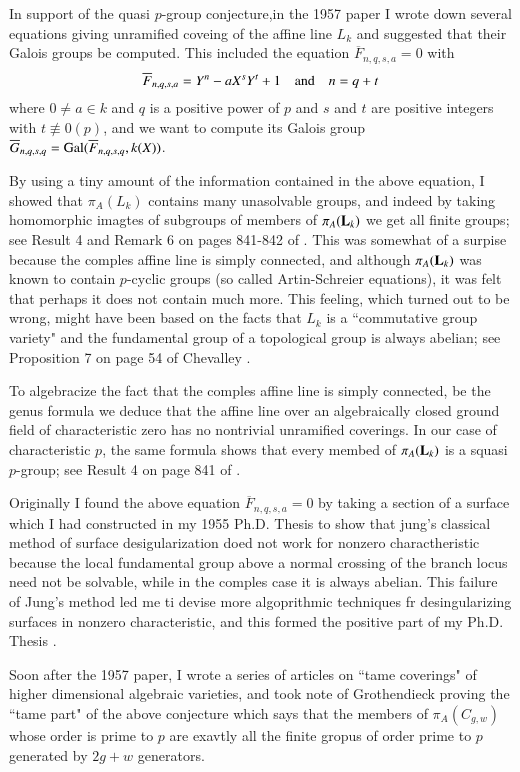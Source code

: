 In support of the quasi $p$-group conjecture,in the 1957 paper  I wrote down several equations giving unramified coveing of the affine line $L_{k}$ and suggested that their Galois groups be computed. This included the equation $\overline{F}_{n,q,s,a}=0$ with
$$
\overline{F}_{n,q,s,a}=Y^{n}-aX^{s}Y^{t} + 1 \quad {\rm and} \quad n=q+t
$$
where $0\neq a \in k$ and $q$ is a positive power of $p$ and $s$ and $t$ are positive integers with $t \nequiv 0(p)$, and we want to compute its Galois group $\overline{G}_{n,q,s,q} = {\rm Gal}(\overline{F}_{n,q,s,q}, k(X))$.

By using a tiny amount of the information contained in the above equation, I showed that $\pi_{A}(L_{k})$ contains many unasolvable groups, and indeed by taking homomorphic imagtes of subgroups of members of $\pi_{A}(\mathbf{L}_{k})$ we get all finite groups; see Result 4 and Remark 6 on pages 841-842 of \cite{art1-key3}. This was somewhat of a surpise because the comples affine line is simply connected, and although $\pi_{A}(\mathbf{L}_{k})$ was known to contain $p$-cyclic groups (so called Artin-Schreier equations), it was felt that perhaps it does not contain much more. This feeling, which turned out to be wrong, might have been based on the facts that $L_{k}$ is a ``commutative group variety" and the fundamental group of a topological group is always abelian; see Proposition 7 on page 54 of Chevalley \cite{art1-key26}.

To algebracize the fact that the comples affine line is simply connected, be the genus formula we deduce that the affine line over an algebraically closed ground field of characteristic zero has no nontrivial unramified coverings. In our case of characteristic $p$, the same formula shows that every membed of $\pi_{A}(\mathbf{L}_{k})$ is a squasi $p$-group; see Result 4 on page 841 of \cite{art1-key3}.

Originally I found the above equation $\overline{F}_{n,q,s,a}=0$ by taking a section of a surface which I had constructed in my 1955 Ph.D. Thesis \cite{art1-key1} to show that jung's classical method \cite{art1-key40} of surface desigularization doed not work for nonzero charactheristic because the local fundamental group above a normal crossing of the branch locus need not be solvable, while in the comples case it is always abelian. This failure of Jung's method led me ti devise more algoprithmic techniques fr desingularizing surfaces in nonzero characteristic, and this formed the positive part of my Ph.D. Thesis \cite{art1-key2}.

Soon after the 1957 paper, I wrote a series of articles \cite{art1-key4} on ``tame coverings" of higher dimensional algebraic varieties, and took note of Grothendieck \cite{art1-key33} proving the ``tame part" of the above conjecture which says that the members of $\pi_{A}(C_{g,w})$ whose order is prime to $p$ are exavtly all the finite gropus of order prime to $p$ generated by $2g+w$ generators.


